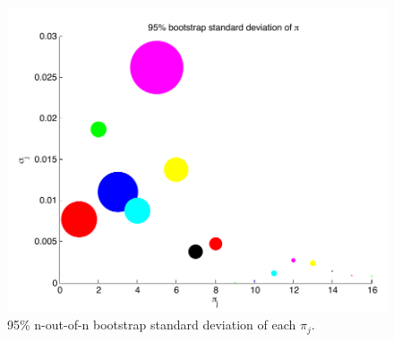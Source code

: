\documentclass[12pt]{amsart}
\begin{document}
\begin{figure}
	
	\begin{center}
		\includegraphics[scale=0.5]{boot_mn_stdev.pdf}
	\end{center}
	\caption{95\% n-out-of-n bootstrap standard deviation of each $\pi_j$.}
\end{figure}
\end{document}
